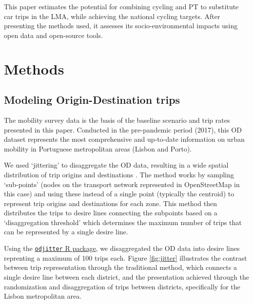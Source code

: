 \documentclass[review, doubleblind, 3p,
authoryear]{elsarticle} %
\begin{document}
This paper estimates the potential for combining cycling and PT to
substitute car trips in the LMA, while achieving the national cycling
targets. After presenting the methods used, it assesses its
socio-environmental impacts using open data and open-source tools.

\section{Methods}\label{methods}

\subsection{Modeling Origin-Destination
trips}\label{modeling-origin-destination-trips}

The mobility survey data \citep{IMOB} is the basis of the baseline
scenario and trip rates presented in this paper. Conducted in the
pre-pandemic period (2017), this OD dataset represents the most
comprehensive and up-to-date information on urban mobility in Portuguese
metropolitan areas (Lisbon and Porto).

We used `jittering' to disaggregate the OD data, resulting in a wide
spatial distribution of trip origins and destinations
\citep{Lovelace2022Jittering}. The method works by sampling `sub-points'
(nodes on the transport network represented in OpenStreetMap in this
case) and using these instead of a single point (typically the centroid)
to represent trip origins and destinations for each zone. This method
then distributes the trips to desire lines connecting the subpoints
based on a `disaggregation threshold' which determines the maximum
number of trips that can be represented by a single desire line.

Using the
\href{https://github.com/dabreegster/odjitter}{\texttt{odjitter} R
package}, we disaggregated the OD data into desire lines reprenting a
maximum of 100 trips each. Figure \ref{fig:jitter} illustrates the
contrast between trip representation through the traditional method,
which connects a single desire line between each district, and the
presentation achieved through the randomization and disaggregation of
trips between districts, specifically for the Lisbon metropolitan area.
\end{document}
